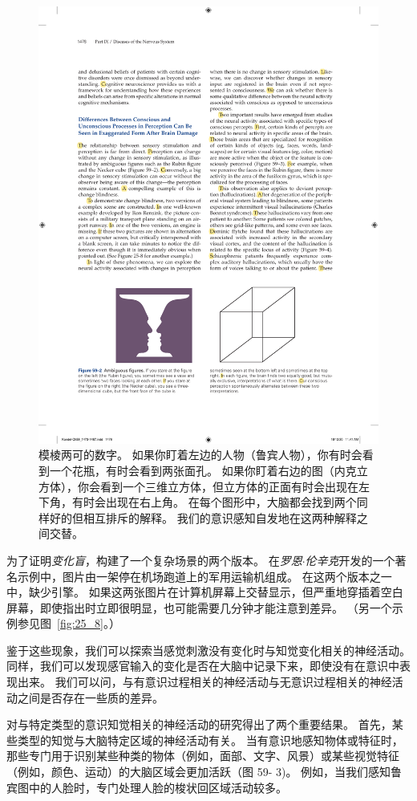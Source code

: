 \begin{figure}[htbp]
	\centering
	\includegraphics[width=0.7\linewidth]{chap59/fig_59_2}
	\caption{模棱两可的数字。
		如果你盯着左边的人物（鲁宾人物），你有时会看到一个花瓶，有时会看到两张面孔。
		如果你盯着右边的图（内克立方体），你会看到一个三维立方体，但立方体的正面有时会出现在左下角，有时会出现在右上角。
		在每个图形中，大脑都会找到两个同样好的但相互排斥的解释。
		我们的意识感知自发地在这两种解释之间交替。}
	\label{fig:59_2}
\end{figure}


为了证明\textit{变化盲}，构建了一个复杂场景的两个版本。
在\textit{罗恩$\cdot$伦辛克}开发的一个著名示例中，图片由一架停在机场跑道上的军用运输机组成。
在这两个版本之一中，缺少引擎。
如果这两张图片在计算机屏幕上交替显示，但严重地穿插着空白屏幕，即使指出时立即很明显，也可能需要几分钟才能注意到差异。
（另一个示例参见图~\ref{fig:25_8}。）


鉴于这些现象，我们可以探索当感觉刺激没有变化时与知觉变化相关的神经活动。
同样，我们可以发现感官输入的变化是否在大脑中记录下来，即使没有在意识中表现出来。
我们可以问，与有意识过程相关的神经活动与无意识过程相关的神经活动之间是否存在一些质的差异。


对与特定类型的意识知觉相关的神经活动的研究得出了两个重要结果。
首先，某些类型的知觉与大脑特定区域的神经活动有关。
当有意识地感知物体或特征时，那些专门用于识别某些种类的物体（例如，面部、文字、风景）或某些视觉特征（例如，颜色、运动）的大脑区域会更加活跃（图 59- 3)。
例如，当我们感知鲁宾图中的人脸时，专门处理人脸的梭状回区域活动较多。


